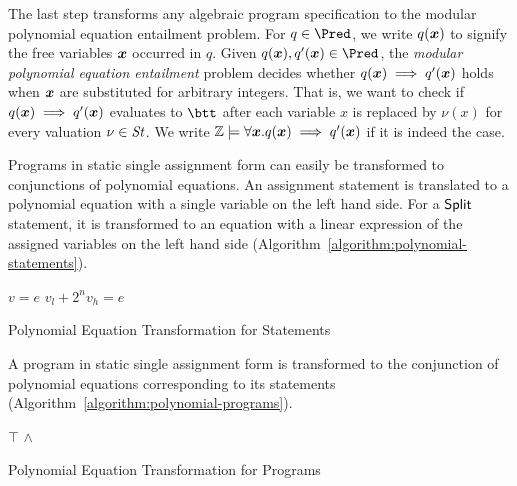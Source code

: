
The last step transforms any algebraic program specification to the 
modular polynomial equation entailment problem. For
$q \in \Pred$, we write $q(\vx)$ to signify the free variables $\vx$
occurred in $q$. Given $q(\vx), q'(\vx) \in \Pred$, the \emph{modular
  polynomial equation entailment} problem decides whether 
$q(\vx) \implies q'(\vx)$ holds when $\vx$ are substituted for
arbitrary integers. That is, we want to check if $q(\vx) \implies
q'(\vx)$ evaluates to $\btt$ after each variable $x$ is replaced by
$\nu(x)$ for every valuation $\nu \in \mathit{St}$. We write $\bbfZ \models
\forall \vx. q(\vx) \implies q'(\vx)$ if it is indeed the case.

Programs in static single assignment form can easily be transformed to
conjunctions of polynomial equations. An assignment statement is
translated to a polynomial equation with a single variable on the left
hand side. For a $\mbox{\textsf{Split}}$ statement, it is transformed to an
equation with a linear expression of the assigned variables on the
left hand side (Algorithm~\ref{algorithm:polynomial-statements}). 
\begin{algorithm}
  \begin{algorithmic}[1]
        \Return $v = e$
      \EndCase
        \Return $v_l + 2^n v_h = e$
      \EndCase
    \EndMatch
    \EndFunction
  \end{algorithmic}
  \caption{Polynomial Equation Transformation for Statements}
  \label{algorithm:polynomial-statements}
\end{algorithm}

A program in static single assignment form is transformed to the
conjunction of polynomial equations corresponding to its statements
(Algorithm~\ref{algorithm:polynomial-programs}). 

\begin{algorithm}
  \begin{algorithmic}[1]
      \Case{$\epsilon$} \Return $\top$ \EndCase
        \Return {} $\wedge$
      \EndCase
    \EndMatch
    \EndFunction
  \end{algorithmic}
  \caption{Polynomial Equation Transformation for Programs}
  \label{algorithm:polynomial-programs}
\end{algorithm}

